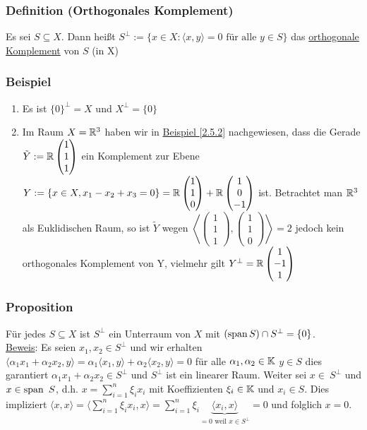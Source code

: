 \subsubsection{Definition (Orthogonales Komplement)}
Es sei $S \subseteq X$. Dann heißt $S^\bot:=\{x\in X:\langle x,y \rangle =0\text{ für alle }y\in S\}$
 das \underline{orthogonale Komplement} von $S$ (in X)
\subsubsection{Beispiel}
\numbers
\begin{enumerate}
\item Es ist $\{0\}^\bot=X$ und $X^{\bot}=\{0\}$
\item Im Raum $X=\mathbb{R}^3$ haben wir in \hyperref[2.5.2]{Beispiel \ref*{2.5.2}} nachgewiesen, dass die Gerade $\tilde{Y}:=\mathbb{R}\begin{pmatrix}1 \\1 \\1\end{pmatrix}$ ein Komplement zur Ebene $Y:=\{x\in X, x_1-x_2+x_3=0\}=\mathbb{R}\begin{pmatrix}1\\1\\0\end{pmatrix}+\mathbb{R}\begin{pmatrix}1\\0\\-1\end{pmatrix}$ ist.
Betrachtet man $\mathbb{R}^3$ als Euklidischen Raum, so ist $\tilde{Y}$ wegen $\left\langle \begin{pmatrix}1 \\1 \\1\end{pmatrix},\begin{pmatrix}1 \\1 \\0\end{pmatrix}\right\rangle=2$ jedoch kein orthogonales Komplement von Y, vielmehr gilt $Y^{\bot}=\mathbb{R}\begin{pmatrix}1 \\-1 \\1\end{pmatrix}$
\end{enumerate}
\subsubsection{Proposition}
\label{5.1.9}
Für jedes $S\subseteq X$ ist $S^{\bot}$ ein Unterraum von $X$ mit $(\operatorname{span} S)\cap S^{\bot}=\{0\}$.\\
\underline{Beweis}: Es seien $x_1,x_2\in S^{\bot}$ und wir erhalten $\langle \alpha_1 x_1+\alpha_2 x_2,y\rangle=\alpha_1\langle x_1,y\rangle+\alpha_2\langle x_2,y\rangle=0$ für alle $\alpha_1,\alpha_2\in\mathbb{K}$ $y\in S$ dies garantiert $\alpha_1 x_1+\alpha_2 x_2\in S^{\bot}$ und $S^{\bot}$ ist ein linearer Raum.
Weiter sei $x\in\ S^{\bot}$ und $x\in \operatorname{span} ~S$, d.h. $x=\sum_{i=1}^n \xi_i x_i$ mit Koeffizienten $\xi_i\in \mathbb{K}$ und $x_i\in S$. Dies impliziert $\langle x,x\rangle=\langle \sum_{i=1}^n \xi_i x_i,x\rangle=\sum_{i=1}^n\xi_i \underbrace{\langle x_i,x\rangle}_{=0\text{ weil }x\in S^{\bot}}=0$ und folglich $x=0$.
